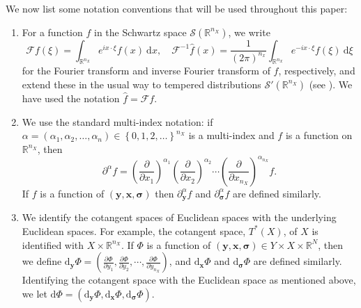 \documentclass[11pt]{article}
\newcommand{\br}{\mathbb{R}}
\newcommand{\al}{\alpha}
\newcommand{\dd}{\mathrm{d}}
\numberwithin{equation}{section}
\newcommand{\smo}{\setminus \mathbf{0}}
\newcommand{\paren}[1]{\left(#1\right)}               %
\newcommand{\sparen}[1]{\left\{#1\right\}}      %
\renewcommand{\d}{\,\dd }  %
\newcommand{\vy}{\mathbf{y}}
\newcommand{\vx}{\mathbf{x}}
\newcommand{\vz}{\mathbf{z}}
\newcommand{\Fc}{\mathcal{F}}
\newcommand{\Sc}{\mathcal{S}}
\newcommand{\vsig}{{\boldsymbol{\sigma}}}
\newcommand{\rr}{{{\mathbb R}}}
\newcommand{\partyf}[2]{\frac{\partial #2}{\partial y_{#1}}}
\theoremstyle{definition}
\begin{document}
We now list some notation conventions that will be used throughout this paper:
\begin{enumerate}
\item For a function $f$ in the Schwartz space $\Sc(\br^{n_X})$, we {write
\[
\mathcal{F}f(\xi) = \int_{\br^{n_X}} e^{i x\cdot \xi}f(x)\ \dd x,\quad 
\mathcal{F}^{-1}\hat f(x) = \frac{1}{(2 \pi)^{n_x}}\int_{\br^{n_X}} e^{-i x\cdot \xi}f(\xi)\ \dd \xi
\]
for} the Fourier transform and inverse Fourier transform of $f$,
respectively, {and extend these in the usual way to tempered distributions $\Sc'(\br^{n_X})$} (see \cite[Section 7.1]{hor}). We have used the notation $\hat{f} = \mathcal{F}f$. %

\item We use the standard multi-index notation: if
$\al=(\al_1,\al_2,\dots,\al_n)\in \sparen{0,1,2,\dots}^{n_X}$
is a multi-index and $f$ is a function on $\br^{n_X}$, then
\[\partial^\al f=\paren{\frac{\partial}{\partial
x_1}}^{\al_1}\paren{\frac{\partial}{\partial
x_2}}^{\al_2}\cdots\paren{\frac{\partial}{\partial x_{n_X}}}^{\al_{n_X}}
f.\] If $f$ is a function of $(\vy,\vx,\vsig)$ then $\partial^\al_\vy f$ and $\partial^\al_\vsig f$ are defined similarly.



\item \label{item:T*Xident} We identify the cotangent
spaces of Euclidean spaces with the underlying Euclidean spaces. For example, the cotangent space, 
$T^*(X)$, of $X$ is identified with $X\times \br^{n_X}$. If $\Phi$ is a function of $(\vy,\vx,\vsig)\in Y\times X\times \rr^N$,
then we define $\dd_{\vy} \Phi = \paren{\partyf{1}{\Phi},
\partyf{2}{\Phi}, \cdots, \partyf{{n_X}}{\Phi} }$, and $\dd_\vx\Phi$ and $
\dd_{\vsig} \Phi $ are defined similarly. Identifying the cotangent space with the Euclidean space as mentioned above, we let $\dd\Phi =
\paren{\dd_{\vy} \Phi, \dd_{\vx} \Phi,\dd_{\vsig} \Phi}$.



\end{enumerate}
\end{document}
